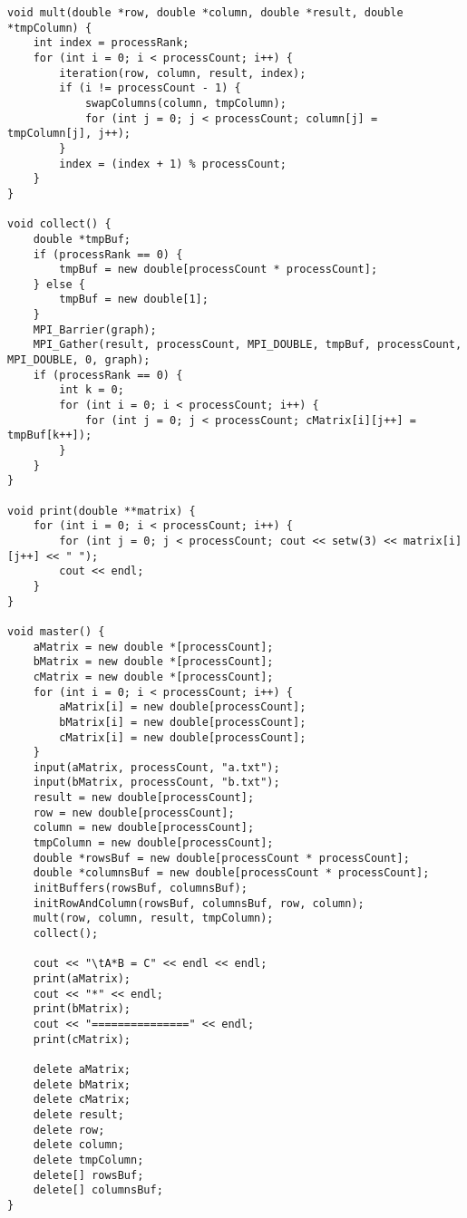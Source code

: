 \documentclass[a4paper,14pt]{extarticle}
\begin{document}
\begin{lstlisting}
void mult(double *row, double *column, double *result, double *tmpColumn) { 
    int index = processRank; 
    for (int i = 0; i < processCount; i++) { 
        iteration(row, column, result, index); 
        if (i != processCount - 1) { 
            swapColumns(column, tmpColumn); 
            for (int j = 0; j < processCount; column[j] = tmpColumn[j], j++); 
        } 
        index = (index + 1) % processCount; 
    } 
} 
  
void collect() { 
    double *tmpBuf; 
    if (processRank == 0) { 
        tmpBuf = new double[processCount * processCount]; 
    } else { 
        tmpBuf = new double[1]; 
    } 
    MPI_Barrier(graph); 
    MPI_Gather(result, processCount, MPI_DOUBLE, tmpBuf, processCount, MPI_DOUBLE, 0, graph); 
    if (processRank == 0) { 
        int k = 0; 
        for (int i = 0; i < processCount; i++) { 
            for (int j = 0; j < processCount; cMatrix[i][j++] = tmpBuf[k++]); 
        } 
    } 
} 
  
void print(double **matrix) { 
    for (int i = 0; i < processCount; i++) { 
        for (int j = 0; j < processCount; cout << setw(3) << matrix[i][j++] << " "); 
        cout << endl; 
    } 
} 
  
void master() { 
    aMatrix = new double *[processCount]; 
    bMatrix = new double *[processCount]; 
    cMatrix = new double *[processCount]; 
    for (int i = 0; i < processCount; i++) { 
        aMatrix[i] = new double[processCount]; 
        bMatrix[i] = new double[processCount]; 
        cMatrix[i] = new double[processCount]; 
    } 
    input(aMatrix, processCount, "a.txt"); 
    input(bMatrix, processCount, "b.txt"); 
    result = new double[processCount]; 
    row = new double[processCount]; 
    column = new double[processCount]; 
    tmpColumn = new double[processCount]; 
    double *rowsBuf = new double[processCount * processCount]; 
    double *columnsBuf = new double[processCount * processCount]; 
    initBuffers(rowsBuf, columnsBuf); 
    initRowAndColumn(rowsBuf, columnsBuf, row, column); 
    mult(row, column, result, tmpColumn); 
    collect(); 
  
    cout << "\tA*B = C" << endl << endl; 
    print(aMatrix); 
    cout << "*" << endl; 
    print(bMatrix); 
    cout << "===============" << endl; 
    print(cMatrix); 
  
    delete aMatrix; 
    delete bMatrix; 
    delete cMatrix; 
    delete result; 
    delete row; 
    delete column; 
    delete tmpColumn; 
    delete[] rowsBuf; 
    delete[] columnsBuf; 
} 
  

\end{lstlisting}
\end{document}
